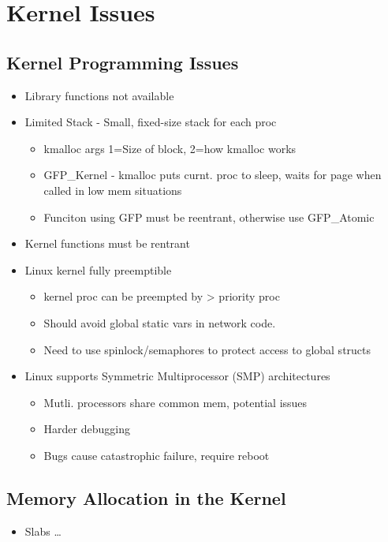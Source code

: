 \section{Kernel Issues}

\subsection{Kernel Programming Issues}

\begin{itemize}
	\item Library functions not available
	\item Limited Stack - Small, fixed-size stack for each proc
	\begin{itemize}
		\item kmalloc args 1=Size of block, 2=how kmalloc works
		\item GFP\_Kernel - kmalloc puts curnt. proc to sleep, waits for
			page when called in low mem situations
		\item Funciton using GFP must be reentrant, otherwise use
			GFP\_Atomic
	\end{itemize}
	\item Kernel functions must be rentrant
	\item Linux kernel fully preemptible
	\begin{itemize}
		\item kernel proc can be preempted by > priority proc
		\item Should avoid global static vars in network code.
		\item Need to use spinlock/semaphores to protect access to
			global structs
	\end{itemize}
	\item Linux supports Symmetric Multiprocessor (SMP) architectures
	\begin{itemize}
		\item Mutli. processors share common mem, potential issues
		\item Harder debugging
		\item Bugs cause catastrophic failure, require reboot
	\end{itemize}
\end{itemize}

\subsection{Memory Allocation in the Kernel}

\begin{itemize}
	\item Slabs \ldots
\end{itemize}

